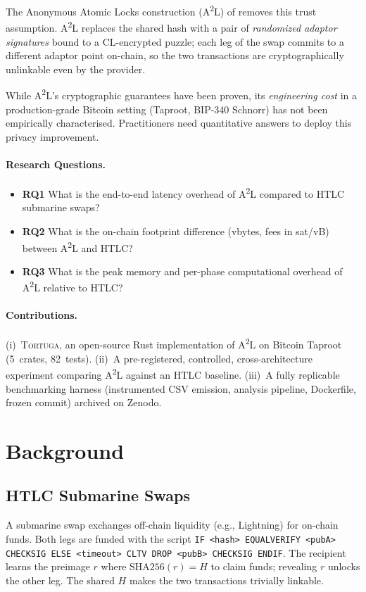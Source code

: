 \documentclass[sigconf,nonacm]{acmart}
\newcommand{\toolname}{\textsc{Tortuga}\xspace}
\newcommand{\atwol}{A\textsuperscript{2}L\xspace}
\newcommand{\rqlabel}[1]{\textbf{RQ#1}}
\newcommand{\code}[1]{\texttt{\small #1}}
\begin{document}
The Anonymous Atomic Locks construction (\atwol) of \citet{tairi2021a2l}
removes this trust assumption. \atwol replaces the shared hash with a pair
of \emph{randomized adaptor signatures} bound to a CL-encrypted puzzle;
each leg of the swap commits to a different adaptor point on-chain, so the
two transactions are cryptographically unlinkable even by the provider.

While \atwol's cryptographic guarantees have been proven, its
\emph{engineering cost} in a production-grade Bitcoin setting (Taproot,
BIP-340 Schnorr) has not been empirically characterised. Practitioners need
quantitative answers to deploy this privacy improvement.

\paragraph*{Research Questions.}
\begin{itemize}
	\item \rqlabel{1} What is the end-to-end latency overhead of \atwol
	      compared to HTLC submarine swaps?
	\item \rqlabel{2} What is the on-chain footprint difference (vbytes,
	      fees in sat/vB) between \atwol and HTLC?
	\item \rqlabel{3} What is the peak memory and per-phase computational
	      overhead of \atwol relative to HTLC?
\end{itemize}

\paragraph*{Contributions.}
(i)~\toolname, an open-source Rust implementation of \atwol on Bitcoin
Taproot (5~crates, \num{82}~tests).
(ii)~A pre-registered, controlled, cross-architecture experiment
comparing \atwol against an HTLC baseline.
(iii)~A fully replicable benchmarking harness (instrumented CSV emission,
analysis pipeline, Dockerfile, frozen commit) archived on Zenodo.

\section{Background}
\label{sec:background}

\subsection{HTLC Submarine Swaps}
A submarine swap exchanges off-chain liquidity (e.g., Lightning) for on-chain
funds. Both legs are funded with the script\linebreak
\code{IF <hash> EQUALVERIFY <pubA> CHECKSIG ELSE <timeout> CLTV DROP <pubB> CHECKSIG ENDIF}.
The recipient learns the preimage $r$ where $\text{SHA256}(r) = H$ to claim
funds; revealing $r$ unlocks the other leg. The shared $H$ makes the two
transactions trivially linkable.
\end{document}
